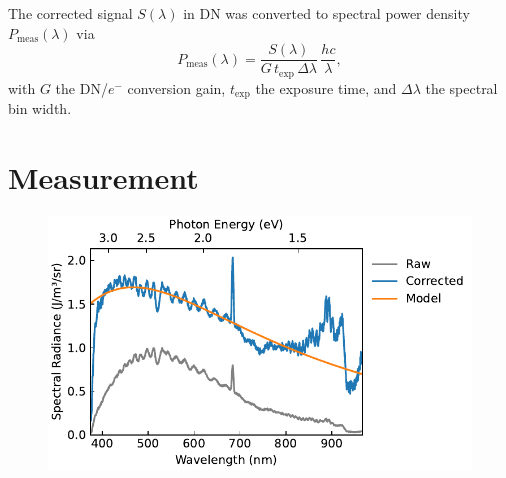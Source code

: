 \documentclass[
	parskip=half,
	a4paper,
]{scrarticle}
\begin{document}
The corrected signal \(S(\lambda)\) in DN was converted to spectral power density \(P_{\text{meas}}(\lambda)\) via
\begin{equation}
  P_{\text{meas}}(\lambda)
  = \frac{S(\lambda)}{G\,t_{\text{exp}}\,\Delta\lambda}\,\frac{hc}{\lambda},
\end{equation}
with \(G\) the DN/\(e^-\) conversion gain, \(t_{\text{exp}}\) the exposure time, and \(\Delta\lambda\) the spectral bin width.  

\clearpage
\section{Measurement}
\begin{figure}[h]
    \centering
    \includegraphics{../analysis/figures/combined.fit.pdf}
    \label{fig:fit}
    \caption{}
\end{figure}

\clearpage
\printbibliography
\end{document}
